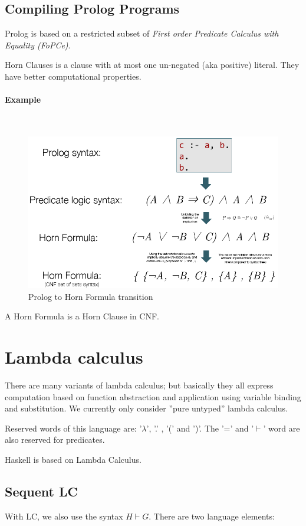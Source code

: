 \subsection{Compiling Prolog Programs}

Prolog is based on a restricted subset of \emph{First order Predicate Calculus with Equality (FoPCe)}.

Horn Clauses is a clause with at most one un-negated (aka positive) literal. They have better computational properties.

\paragraph{Example} \hfill \\
\begin{figure}[H]
\centering
\includegraphics[width=0.6\linewidth]{images/prolog_to_horn_formula}
\caption{Prolog to Horn Formula transition}
\label{fig:prologtohornformula}
\end{figure}

A Horn Formula is a Horn Clause in CNF.


\section{Lambda calculus}

There are many variants of lambda calculus; but basically they all express computation based on function abstraction and application using variable binding and substitution. We currently only consider ''pure untyped'' lambda calculus.

Reserved words of this language are: '$\lambda$', '.' , '(' and ')'. The '=' and '$\vdash$' word are also reserved for predicates.

Haskell is based on Lambda Calculus.


\subsection{Sequent LC}
With LC, we also use the syntax $H \vdash G$. There are two language elements:

